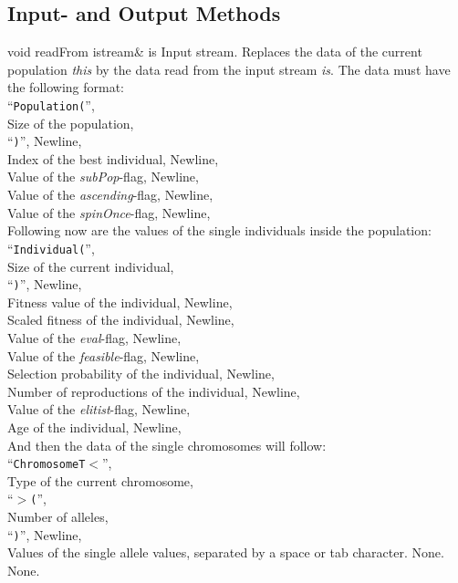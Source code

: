 \clearpage

\subsection{Input- and Output Methods}

\setNormalInstance
\printMethodWithOneParam
{void}
{readFrom}
{istream\&}
{is}
{Input stream.}
{Replaces the data of the current population {\em this} by the data
 read from the input stream {\em is}. The data must have
 the following format:\\
    ``{\tt Population(}'',\\
    Size of the population,\\
    ``{\tt )}'', Newline,\\
    Index of the best individual, Newline,\\
    Value of the {\em subPop}-flag, Newline,\\
    Value of the {\em ascending}-flag, Newline,\\
    Value of the {\em spinOnce}-flag, Newline,\\
    Following now are the values of the single individuals inside
    the population:\\
    ``{\tt Individual(}'',\\
    Size of the current individual,\\ 
    ``{\tt )}'', Newline,\\ 
    Fitness value of the individual, Newline,\\
    Scaled fitness of the individual, Newline,\\
    Value of the {\em eval}-flag, Newline,\\
    Value of the {\em feasible}-flag, Newline,\\
    Selection probability of the individual, Newline,\\
    Number of reproductions of the individual, Newline,\\
    Value of the {\em elitist}-flag, Newline,\\
    Age of the individual, Newline,\\
    And then the data of the single chromosomes will follow:\\
    ``{\tt ChromosomeT$<$}'',\\
    Type of the current chromosome,\\ 
    ``{\tt $>$(}'',\\ 
    Number of alleles,\\    
    ``{\tt )}'', Newline,\\
    Values of the single allele values, separated by a space or
    tab character.}
{None.}
{None.}


